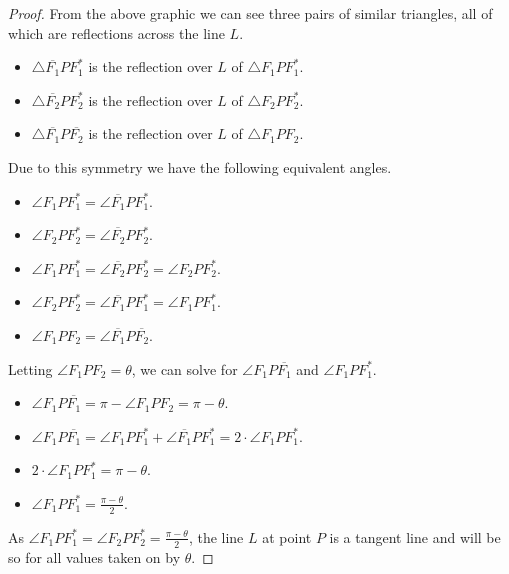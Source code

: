 \documentclass[12pt]{article}
\newcommand{\ds}{\displaystyle}
\theoremstyle{plain}
\begin{document}
\begin{proof}
  From the above graphic we can see three pairs of similar triangles, all of which are reflections across the line $ L $.

  \begin{itemize}
    \item $ \ds \triangle \overline{F_{1}}PF_{1}^{*} $ is the reflection over $ L $ of $ \ds \triangle F_{1}PF_{1}^{*} $.
    \item $ \ds \triangle \overline{F_{2}}PF_{2}^{*} $ is the reflection over $ L $ of $ \ds \triangle F_{2}PF_{2}^{*} $.
    \item $ \ds \triangle \overline{F_{1}}P\overline{F_{2}} $ is the reflection over $ L $ of $ \ds \triangle F_{1}PF_{2} $.
  \end{itemize}

  Due to this symmetry we have the following equivalent angles.

  \begin{itemize}
    \item $ \ds \angle F_{1}PF_{1}^{*} = \angle \overline{F_{1}}PF_{1}^{*} $.
    \item $ \ds \angle F_{2}PF_{2}^{*} = \angle \overline{F_{2}}PF_{2}^{*} $.
    \item $ \ds \angle F_{1}PF_{1}^{*} = \angle \overline{F_{2}}PF_{2}^{*} = \angle F_{2}PF_{2}^{*} $.
    \item $ \ds \angle F_{2}PF_{2}^{*} = \angle \overline{F_{1}}PF_{1}^{*} = \angle F_{1}PF_{1}^{*} $.
    \item $ \ds \angle F_{1}PF_{2} = \angle \overline{F_{1}}P\overline{F_{2}} $.
  \end{itemize}

  Letting $ \ds \angle F_{1}PF_{2} = \theta $, we can solve for $ \ds \angle F_{1}P\overline{F_{1}} $ and $ \ds \angle F_{1}PF_{1}^{*} $.

  \begin{itemize}
    \item $ \ds \angle F_{1}P\overline{F_{1}} = \pi - \angle F_{1}PF_{2} = \pi - \theta $.
    \item $ \ds \angle F_{1}P\overline{F_{1}} = \angle F_{1}PF_{1}^{*} + \angle \overline{F_{1}}PF_{1}^{*} = 2 \cdot \angle F_{1}PF_{1}^{*} $.
    \item $ \ds 2 \cdot \angle F_{1}PF_{1}^{*} = \pi - \theta  $.
    \item $ \ds \angle F_{1}PF_{1}^{*} = \frac{\pi - \theta}{2} $.
  \end{itemize}

  As $ \ds \angle F_{1}PF_{1}^{*} = \angle F_{2}PF_{2}^{*} = \frac{\pi - \theta}{2} $, the line $ L $ at point $ P $ is a tangent line and will be so for all values taken on by $ \theta $.


\end{proof}
\end{document}
